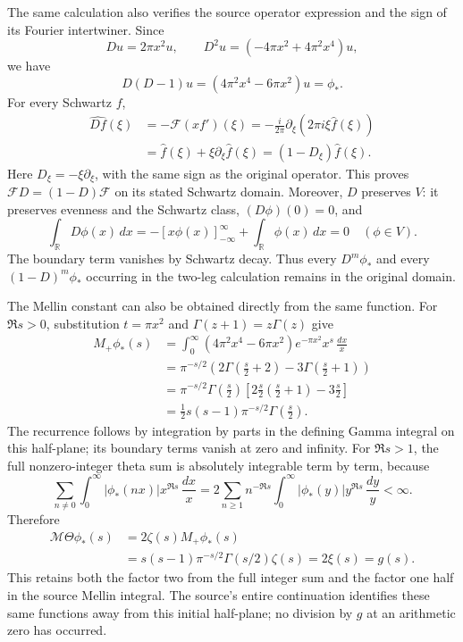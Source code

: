 The same calculation also verifies the source operator expression and
the sign of its Fourier intertwiner. Since
\[
Du=2\pi x^2u,\qquad
D^2u=(-4\pi x^2+4\pi^2x^4)u,
\]
we have
\[
D(D-1)u=(4\pi^2x^4-6\pi x^2)u=\phi_*.
\]
For every Schwartz \(f\),
\[
\begin{aligned}
\widehat{Df}(\xi)
 &=-\mathcal F(xf')(\xi)
 =-\frac{i}{2\pi}\partial_\xi(2\pi i\xi\widehat f(\xi))\\
 &=\widehat f(\xi)+\xi\partial_\xi\widehat f(\xi)
 =(1-D_\xi)\widehat f(\xi).
\end{aligned}
\]
Here \(D_\xi=-\xi\partial_\xi\), with the same sign as the original
operator. This proves \(\mathcal F D=(1-D)\mathcal F\) on its stated
Schwartz domain. Moreover, \(D\) preserves \(V\): it preserves evenness
and the Schwartz class, \((D\phi)(0)=0\), and
\[
\int_{\mathbb R}D\phi(x)\,dx
=-[x\phi(x)]_{-\infty}^{\infty}
 +\int_{\mathbb R}\phi(x)\,dx=0
\quad(\phi\in V).
\]
The boundary term vanishes by Schwartz decay. Thus every
\(D^m\phi_*\) and every \((1-D)^m\phi_*\) occurring in the two-leg
calculation remains in the original domain.

The Mellin constant can also be obtained directly from the same
function. For \(\Re s>0\), substitution \(t=\pi x^2\) and
\(\Gamma(z+1)=z\Gamma(z)\) give
\[
\begin{aligned}
M_+\phi_*(s)
&=\int_0^\infty
 (4\pi^2x^4-6\pi x^2)e^{-\pi x^2}x^s\,\frac{dx}{x}\\
&=\pi^{-s/2}
 \left(2\Gamma\left(\frac s2+2\right)
       -3\Gamma\left(\frac s2+1\right)\right)\\
&=\pi^{-s/2}\Gamma\left(\frac s2\right)
 \left[2\frac s2\left(\frac s2+1\right)-3\frac s2\right]\\
&=\frac12s(s-1)\pi^{-s/2}\Gamma\left(\frac s2\right).
\end{aligned}
\]
The recurrence follows by integration by parts in the defining
Gamma integral on this half-plane; its boundary terms vanish
at zero and infinity. For \(\Re s>1\), the full nonzero-integer
theta sum is absolutely integrable term by term, because
\[
\sum_{n\ne0}\int_0^\infty
 |\phi_*(nx)|x^{\Re s}\,\frac{dx}{x}
=2\sum_{n\ge1}n^{-\Re s}
 \int_0^\infty|\phi_*(y)|y^{\Re s}\,\frac{dy}{y}<\infty.
\]
Therefore
\[
\begin{aligned}
\mathcal M\Theta\phi_*(s)
&=2\zeta(s)M_+\phi_*(s)\\
&=s(s-1)\pi^{-s/2}\Gamma(s/2)\zeta(s)
 =2\xi(s)=g(s).
\end{aligned}
\]
This retains both the factor two from the full integer sum and the
factor one half in the source Mellin integral. The source's entire
continuation identifies these same functions away from this initial
half-plane; no division by \(g\) at an arithmetic zero has occurred.




